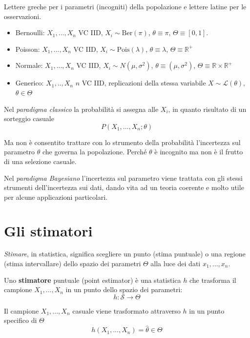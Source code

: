 \documentclass[
  11pt,
]{book}
\providecommand{\tightlist}{%
  \setlength{\itemsep}{0pt}\setlength{\parskip}{0pt}}
\theoremstyle{mytheoremstyle}
\theoremstyle{mydefstyle}
\begin{document}
Lettere greche per i parametri (incogniti) della popolazione e lettere latine per le osservazioni.

\begin{itemize}
\tightlist
\item
  Bernoulli: \(X_1,...,X_n\) VC IID, \(X_i\sim \text{Ber}(\pi)\), \(\theta\equiv\pi\), \(\Theta\equiv[0,1]\).
\item
  Poisson: \(X_1,...,X_n\) VC IID, \(X_i\sim \text{Pois}(\lambda)\), \(\theta\equiv\lambda\), \(\Theta\equiv\mathbb{R}^+\)
\item
  Normale: \(X_1,...,X_n\) VC IID, \(X_i\sim N(\mu,\sigma^2)\), \(\theta\equiv(\mu,\sigma^2)\), \(\Theta\equiv\mathbb{R}\times\mathbb{R}^+\)
\item
  Generico: \(X_1,..,X_n\) \(n\) VC IID, replicazioni della stessa variabile \(X\sim\mathscr{L}(\theta)\), \(\theta\in\Theta\)
\end{itemize}

Nel \emph{paradigma classico} la probabilità si assegna alle \(X_i\), in quanto risultato di un sorteggio casuale
\[P(X_1,...,X_n;\theta)\]

Ma non è consentito trattare con lo strumento della probabilità l'incertezza sul parametro \(\theta\) che governa la popolazione. Perché \(\theta\) è incognito ma non è il frutto di una selezione casuale.

Nel \emph{paradigma Bayesiano} l'incertezza sul parametro viene trattata con gli stessi strumenti dell'incertezza sui dati, dando vita ad un teoria coerente e molto utile per alcune applicazioni particolari.

\section{Gli stimatori}\label{gli-stimatori}

\emph{Stimare}, in statistica, significa scegliere un punto (stima puntuale) o una regione (stima intervallare) dello spazio dei parametri \(\Theta\) alla luce dei dati \(x_1,...,x_n\).

\begin{info}

Uno \textbf{stimatore} puntuale (point estimator) è una statistica \(h\) che trasforma il campione \(X_1,...,X_n\) in un punto dello spazio dei parametri:
\[h:\mathcal{S}\to\Theta\]

\end{info}

Il campione \(X_1,...,X_n\) casuale viene trasformato attraverso \(h\) in un punto specifico di \(\Theta\)
\[h(X_1,...,X_n)=\hat\theta\in\Theta\]
\end{document}
